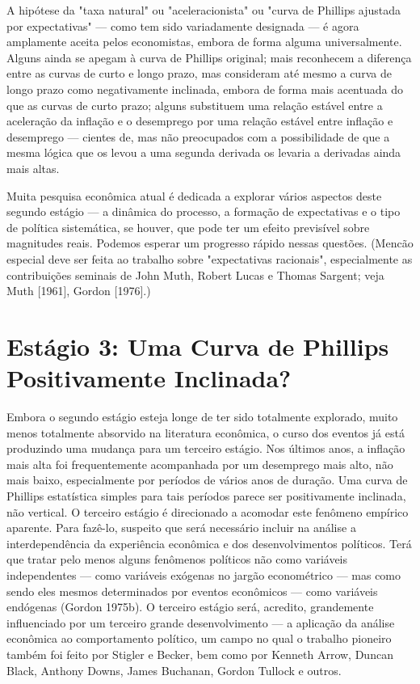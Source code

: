 \documentclass[12pt]{article}
\begin{document}
A hipótese da "taxa natural" ou "aceleracionista" ou "curva de Phillips ajustada por expectativas" — como tem sido variadamente designada — é agora amplamente aceita pelos economistas, embora de forma alguma universalmente. Alguns ainda se apegam à curva de Phillips original; mais reconhecem a diferença entre as curvas de curto e longo prazo, mas consideram até mesmo a curva de longo prazo como negativamente inclinada, embora de forma mais acentuada do que as curvas de curto prazo; alguns substituem uma relação estável entre a aceleração da inflação e o desemprego por uma relação estável entre inflação e desemprego — cientes de, mas não preocupados com a possibilidade de que a mesma lógica que os levou a uma segunda derivada os levaria a derivadas ainda mais altas.

Muita pesquisa econômica atual é dedicada a explorar vários aspectos deste segundo estágio — a dinâmica do processo, a formação de expectativas e o tipo de política sistemática, se houver, que pode ter um efeito previsível sobre magnitudes reais. Podemos esperar um progresso rápido nessas questões. (Mencão especial deve ser feita ao trabalho sobre "expectativas racionais", especialmente as contribuições seminais de John Muth, Robert Lucas e Thomas Sargent; veja Muth [1961], Gordon [1976].)

\section{Estágio 3: Uma Curva de Phillips Positivamente Inclinada?}

Embora o segundo estágio esteja longe de ter sido totalmente explorado, muito menos totalmente absorvido na literatura econômica, o curso dos eventos já está produzindo uma mudança para um terceiro estágio. Nos últimos anos, a inflação mais alta foi frequentemente acompanhada por um desemprego mais alto, não mais baixo, especialmente por períodos de vários anos de duração. Uma curva de Phillips estatística simples para tais períodos parece ser positivamente inclinada, não vertical. O terceiro estágio é direcionado a acomodar este fenômeno empírico aparente. Para fazê-lo, suspeito que será necessário incluir na análise a interdependência da experiência econômica e dos desenvolvimentos políticos. Terá que tratar pelo menos alguns fenômenos políticos não como variáveis independentes — como variáveis exógenas no jargão econométrico — mas como sendo eles mesmos determinados por eventos econômicos — como variáveis endógenas (Gordon 1975b). O terceiro estágio será, acredito, grandemente influenciado por um terceiro grande desenvolvimento — a aplicação da análise econômica ao comportamento político, um campo no qual o trabalho pioneiro também foi feito por Stigler e Becker, bem como por Kenneth Arrow, Duncan Black, Anthony Downs, James Buchanan, Gordon Tullock e outros.
\end{document}
